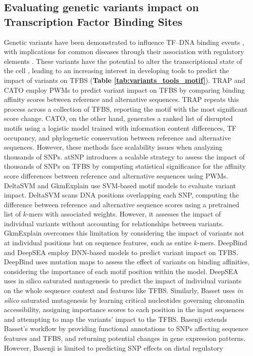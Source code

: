 \documentclass[a4paper, titlepage, openright]{book}
\begin{document}
\subsection{Evaluating genetic variants impact on Transcription Factor Binding Sites}
Genetic variants have been demonstrated to influence TF–DNA binding events \citep{de2006regulatory,wienert2015editing,weinhold2014genome}, with implications for common diseases through their association with regulatory elements \citep{maurano2012systematic}. These variants have the potential to alter the transcriptional state of the cell \citep{deplancke2016genetics}, leading to an increasing interest in developing tools to predict the impact of variants on TFBS (\textbf{Table \ref{tab:variants_tools_motif}}). TRAP \citep{thomas2011transcription} and CATO \citep{maurano2015large} employ PWMs to predict variant impact on TFBS by comparing binding affinity scores between reference and alternative sequences. TRAP repeats this process across a collection of TFBS, reporting the motif with the most significant score change. CATO, on the other hand, generates a ranked list of disrupted motifs using a logistic model trained with information content differences, TF occupancy, and phylogenetic conservation between reference and alternative sequences. However, these methods face scalability issues when analyzing thousands of SNPs. atSNP \citep{zuo2015atsnp} introduces a scalable strategy to assess the impact of thousands of SNPs on TFBS by computing statistical significance for the affinity score differences between reference and alternative sequences using PWMs. DeltaSVM \citep{lee2015method} and GkmExplain \citep{shrikumar2019gkmexplain} use SVM-based motif models to evaluate variant impact. DeltaSVM scans DNA positions overlapping each SNP, computing the difference between reference and alternative sequence scores using a pretrained list of $k$-mers with associated weights. However, it assesses the impact of individual variants without accounting for relationships between variants. GkmExplain overcomes this limitation by considering the impact of variants not at individual positions but on sequence features, such as entire $k$-mers. DeepBind \citep{alipanahi2015predicting} and DeepSEA \citep{zhou2015predicting} employ DNN-based models to predict variant impact on TFBS. DeepBind uses mutation maps to assess the effect of variants on binding affinities, considering the importance of each motif position within the model. DeepSEA uses in silico saturated mutagenesis to predict the impact of individual variants on the whole sequence context and features like TFBS. Similarly, Basset \citep{kelley2016basset} uses \emph{in silico} saturated mutagenesis by learning critical nucleotides governing chromatin accessibility, assigning importance scores to each position in the input sequences and attempting to map the variants' impact to the TFBS. Basenji \citep{kelley2018sequential} extends Basset’s workflow by providing functional annotations to SNPs affecting sequence features and TFBS, and returning potential changes in gene expression patterns. However, Basenji is limited to predicting SNP effects on distal regulatory 
\end{document}
